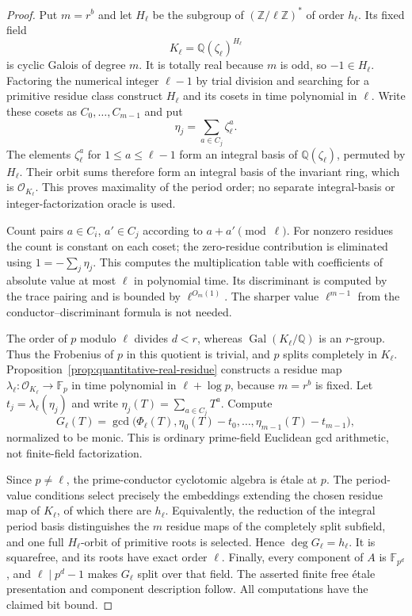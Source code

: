 \documentclass[11pt]{article}
\theoremstyle{definition}
\theoremstyle{remark}
\begin{document}
\begin{proof}
Put $m=r^b$ and let $H_\ell$ be the subgroup of
$(\mathbb Z/\ell\mathbb Z)^*$ of order $h_\ell$.
Its fixed field
\[
 K_\ell=\mathbb Q(\zeta_\ell)^{H_\ell}
\]
is cyclic Galois of degree $m$.  It is totally real because $m$ is odd,
so $-1\in H_\ell$.
Factoring the numerical integer $\ell-1$ by trial division and searching
for a primitive residue class construct $H_\ell$ and its cosets in time
polynomial in $\ell$.  Write these cosets as $C_0,\ldots,C_{m-1}$ and put
\[
 \eta_j=\sum_{a\in C_j}\zeta_\ell^a.
\]
The elements $\zeta_\ell^a$ for $1\leq a\leq\ell-1$ form an integral
basis of $\mathbb Q(\zeta_\ell)$, permuted by $H_\ell$.
Their orbit sums therefore form an integral basis of the invariant ring,
which is $\mathcal O_{K_\ell}$.  This proves maximality of the period order;
no separate integral-basis or integer-factorization oracle is used.

Count pairs $a\in C_i$, $a'\in C_j$ according to $a+a'\pmod\ell$.
For nonzero residues the count is constant on each coset; the zero-residue
contribution is eliminated using $1=-\sum_j\eta_j$.
This computes the multiplication table with coefficients of absolute value
at most $\ell$ in polynomial time.  Its discriminant is computed by the
trace pairing and is bounded by $\ell^{O_m(1)}$.  The sharper value
$\ell^{m-1}$ from the conductor--discriminant formula is not needed.

The order of $p$ modulo $\ell$ divides $d<r$, whereas
$\operatorname{Gal}(K_\ell/\mathbb Q)$ is an $r$-group.
Thus the Frobenius of $p$ in this quotient is trivial, and $p$ splits
completely in $K_\ell$.  Proposition~\ref{prop:quantitative-real-residue}
constructs a residue map $\lambda_\ell:\mathcal O_{K_\ell}\to\mathbb F_p$
in time polynomial in $\ell+\log p$, because $m=r^b$ is fixed.
Let $t_j=\lambda_\ell(\eta_j)$ and write
$\eta_j(T)=\sum_{a\in C_j}T^a$.  Compute
\[
 G_\ell(T)=\gcd\bigl(\Phi_\ell(T),
       \eta_0(T)-t_0,\ldots,\eta_{m-1}(T)-t_{m-1}\bigr),
\]
normalized to be monic.  This is ordinary prime-field Euclidean gcd
arithmetic, not finite-field factorization.

Since $p\ne\ell$, the prime-conductor cyclotomic algebra is \'etale at $p$.
The period-value conditions select precisely the embeddings extending the
chosen residue map of $K_\ell$, of which there are $h_\ell$.
Equivalently, the reduction of the integral period basis distinguishes the
$m$ residue maps of the completely split subfield, and one full
$H_\ell$-orbit of primitive roots is selected.  Hence $\deg G_\ell=h_\ell$.
It is squarefree, and its roots have exact order $\ell$.
Finally, every component of $A$ is $\mathbb F_{p^d}$, and
$\ell\mid p^d-1$ makes $G_\ell$ split over that field.
The asserted finite free \'etale presentation and component description
follow.  All computations have the claimed bit bound.
\end{proof}
\end{document}
